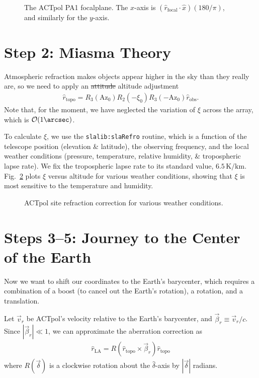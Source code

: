 \documentclass[10pt,preprint]{aastex}
\newcommand{\az}{\mathrm{Az}_0}
\newcommand{\LA}{\mathrm{LA}}
\newcommand{\rhat}{{\hat r}}
\newcommand{\rfocal}{{\hat r}_\mathrm{focal}}
\newcommand{\robs}{{\hat r}_\mathrm{obs}}
\newcommand{\rtopo}{{\hat r}_\mathrm{topo}}
\begin{document}
\begin{figure}
\caption{The ACTpol PA1 focalplane. The $x$-axis is $(\rfocal\cdot\hat x)(180/\pi)$,
and similarly for the $y$-axis.\label{fig:focalplane}}
\end{figure}

\section{Step 2: Miasma Theory}

Atmospheric refraction makes objects appear higher in the sky than they really are,
so we need to apply an \sout{attitude} altitude adjustment
\begin{eqnarray}
\rtopo = R_3(\az)R_2(-\xi_0)R_3(-\az) \robs.
\end{eqnarray}
Note that, for the moment, we have neglected the variation of $\xi$ across the array,
which is ${\cal O}(1\arcsec)$.

To calculate $\xi$, we use the \texttt{slalib:slaRefro} routine, which is
a function of the telescope position (elevation \& latitude), the observing
frequency, and the local weather conditions (pressure, temperature, relative humidity,
\& tropospheric lapse rate).
We fix the tropospheric lapse rate to its standard value, $6.5\,\mathrm{K/km}$.
Fig.~\ref{fig:ref} plots $\xi$ versus altitude for various weather conditions,
showing that $\xi$ is most sensitive to the temperature and humidity.

\begin{figure}
\caption{ACTpol site refraction correction for various weather conditions.\label{fig:ref}}
\end{figure}

\section{Steps 3--5: Journey to the Center of the Earth}

Now we want to shift our coordinates to the Earth's barycenter, which requires
a combination of a boost (to cancel out the Earth's rotation), a rotation, and a translation.

Let $\vec v_r$ be ACTpol's velocity relative to the Earth's barycenter, and $\vec\beta_r\equiv\vec v_r/c$.
Since $|\vec\beta_r| \ll 1$, we can approximate the aberration correction as
\begin{eqnarray}
\rhat_\LA = R(\rtopo\times\vec\beta_r) \rtopo
\end{eqnarray}
where $R(\vec\delta)$ is a clockwise rotation about the $\hat\delta$-axis by $|\vec\delta|$ radians.
\end{document}
